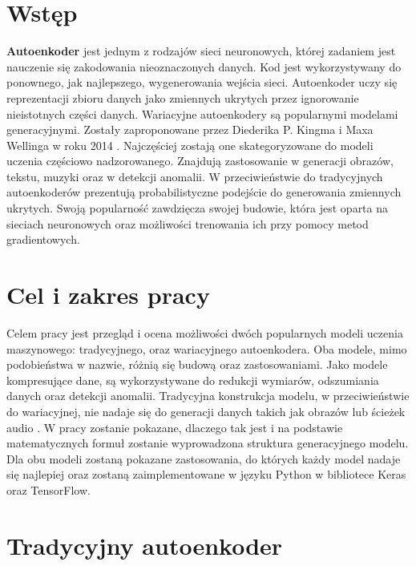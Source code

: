 \documentclass[a4paper,12pt,oneside]{book} %
\begin{document}
\sloppy

\thispagestyle{empty}



\tableofcontents{}

\chapter*{Wstęp} %
\textbf{Autoenkoder} jest jednym z rodzajów sieci neuronowych, której zadaniem jest nauczenie się zakodowania nieoznaczonych danych. Kod jest wykorzystywany do ponownego, jak najlepszego, wygenerowania wejścia sieci. Autoenkoder uczy się reprezentacji zbioru danych jako zmiennych ukrytych przez ignorowanie nieistotnych części danych.
Wariacyjne autoenkodery są popularnymi modelami generacyjnymi. Zostały zaproponowane przez Diederika P. Kingma i Maxa Wellinga w roku 2014 \cite{kingma2014autoencoding}. Najczęściej zostają one skategoryzowane do modeli uczenia częściowo nadzorowanego. Znajdują zastosowanie w generacji obrazów, tekstu, muzyki oraz w detekcji anomalii. W przeciwieństwie do tradycyjnych autoenkoderów prezentują probabilistyczne podejście do generowania zmiennych ukrytych. Swoją popularność zawdzięcza swojej budowie, która jest oparta na sieciach neuronowych oraz możliwości trenowania ich przy pomocy metod gradientowych.
\chapter*{Cel i zakres pracy}
Celem pracy jest przegląd i ocena możliwości dwóch popularnych modeli uczenia maszynowego: tradycyjnego, oraz wariacyjnego autoenkodera. Oba modele, mimo podobieństwa w nazwie, różnią się budową oraz zastosowaniami. Jako modele kompresujące dane, są wykorzystywane do redukcji wymiarów, odszumiania danych oraz detekcji anomalii. Tradycyjna konstrukcja modelu, w przeciwieństwie do wariacyjnej, nie nadaje się do generacji danych takich jak obrazów lub ścieżek audio \cite{vaeaudio}. W pracy zostanie pokazane, dlaczego tak jest i na podstawie matematycznych formuł zostanie wyprowadzona struktura generacyjnego modelu. Dla obu modeli zostaną pokazane zastosowania, do których każdy model nadaje się najlepiej oraz zostaną zaimplementowane w języku Python w bibliotece Keras oraz TensorFlow.
\chapter{Tradycyjny autoenkoder}
\end{document}

